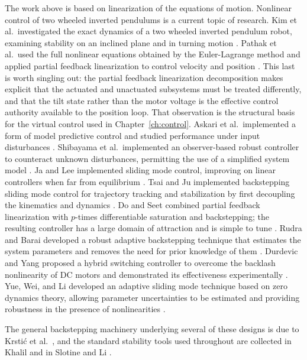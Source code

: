 The work above is based on linearization of the equations of motion. Nonlinear
control of two wheeled inverted pendulums is a current topic of research. Kim et
al.\ investigated the exact dynamics of a two wheeled inverted pendulum robot,
examining stability on an inclined plane and in turning motion
\cite{kim2005dynamic}. Pathak et al.\ used the full nonlinear equations obtained
by the Euler-Lagrange method and applied partial feedback linearization to
control velocity and position \cite{pathak2005twip}. This last is worth
singling out: the partial feedback linearization decomposition makes explicit
that the actuated and unactuated subsystems must be treated differently, and
that the tilt state rather than the motor voltage is the effective control
authority available to the position loop. That observation is the structural
basis for the virtual control used in Chapter~\ref{ch:control}. Askari et al.\
implemented a form of model predictive control and studied performance under
input disturbances \cite{askari2009model}. Shibayama et al.\ implemented an
observer-based robust controller to counteract unknown disturbances, permitting
the use of a simplified system model \cite{shibayama2010robust}. Ja and Lee
implemented sliding mode control, improving on linear controllers when far from
equilibrium \cite{ja2012position}. Tsai and Ju implemented backstepping sliding
mode control for trajectory tracking and stabilization by first decoupling the
kinematics and dynamics \cite{tsai2010trajectory}. Do and Seet combined partial
feedback linearization with $p$-times differentiable saturation and backstepping;
the resulting controller has a large domain of attraction and is simple to tune
\cite{do2010motion}. Rudra and Barai developed a robust adaptive backstepping
technique that estimates the system parameters and removes the need for prior
knowledge of them \cite{rudra2012robust}. Durdevic and Yang proposed a hybrid
switching controller to overcome the backlash nonlinearity of DC motors and
demonstrated its effectiveness experimentally \cite{durdevic2013hybrid}. Yue,
Wei, and Li developed an adaptive sliding mode technique based on zero dynamics
theory, allowing parameter uncertainties to be estimated and providing
robustness in the presence of nonlinearities \cite{yue2014adaptive}.

The general backstepping machinery underlying several of these designs is due to
Krsti\'c et al.\ \cite{krstic1995nonlinear}, and the standard stability tools
used throughout are collected in Khalil \cite{khalil2002nonlinear} and in Slotine
and Li \cite{slotine1991applied}.

